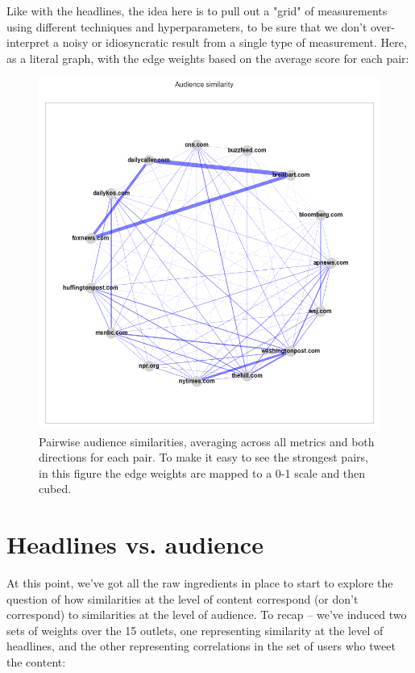 \documentclass{scrartcl}
\begin{document}
Like with the headlines, the idea here is to pull out a "grid" of measurements using different techniques and hyperparameters, to be sure that we don't over-interpret a noisy or idiosyncratic result from a single type of measurement. Here, as a literal graph, with the edge weights based on the average score for each pair:

\begin{figure}[H]
  \centering
  \includegraphics[height=0.5\textheight]{figures/user-graph-radial-all-metrics.png}
  \caption{Pairwise audience similarities, averaging across all metrics and both directions for each pair. To make it easy to see the strongest pairs, in this figure the edge weights are mapped to a 0-1 scale and then cubed.}
\end{figure}

\section{Headlines vs. audience}

At this point, we've got all the raw ingredients in place to start to explore the question of how similarities at the level of content correspond (or don't correspond) to similarities at the level of audience. To recap -- we've induced two sets of weights over the 15 outlets, one representing similarity at the level of headlines, and the other representing correlations in the set of users who tweet the content:
\end{document}
